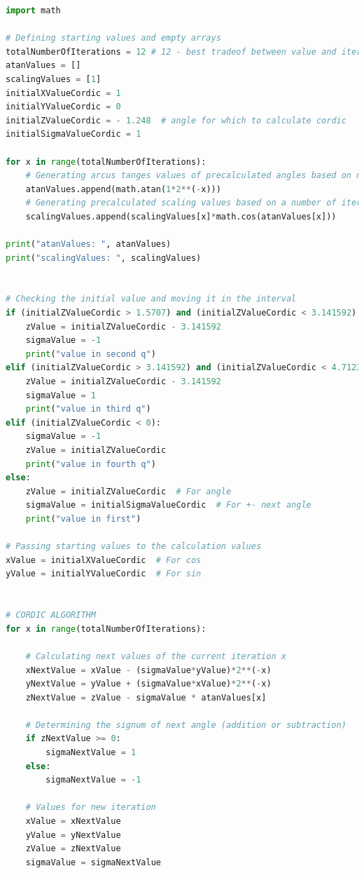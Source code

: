 \documentclass[a4paper, twoside, 11pt]{article}
\begin{document}
\begin{lstlisting}[language={python}, caption={Python code of \gls{abbreviation:cordic} implementation.}, label= {lst:python-cordic}]
import math

# Defining starting values and empty arrays
totalNumberOfIterations = 12 # 12 - best tradeof between value and iterations
atanValues = []
scalingValues = [1]
initialXValueCordic = 1
initialYValueCordic = 0
initialZValueCordic = - 1.248  # angle for which to calculate cordic
initialSigmaValueCordic = 1

for x in range(totalNumberOfIterations):
    # Generating arcus tanges values of precalculated angles based on number of iterations
    atanValues.append(math.atan(1*2**(-x)))
    # Generating precalculated scaling values based on a number of iterations
    scalingValues.append(scalingValues[x]*math.cos(atanValues[x]))

print("atanValues: ", atanValues)
print("scalingValues: ", scalingValues)


# Checking the initial value and moving it in the interval
if (initialZValueCordic > 1.5707) and (initialZValueCordic < 3.141592):
    zValue = initialZValueCordic - 3.141592
    sigmaValue = -1
    print("value in second q")
elif (initialZValueCordic > 3.141592) and (initialZValueCordic < 4.7123):
    zValue = initialZValueCordic - 3.141592
    sigmaValue = 1
    print("value in third q")
elif (initialZValueCordic < 0):
    sigmaValue = -1
    zValue = initialZValueCordic
    print("value in fourth q")
else:
    zValue = initialZValueCordic  # For angle
    sigmaValue = initialSigmaValueCordic  # For +- next angle
    print("value in first")

# Passing starting values to the calculation values
xValue = initialXValueCordic  # For cos
yValue = initialYValueCordic  # For sin


# CORDIC ALGORITHM
for x in range(totalNumberOfIterations):

    # Calculating next values of the current iteration x
    xNextValue = xValue - (sigmaValue*yValue)*2**(-x)
    yNextValue = yValue + (sigmaValue*xValue)*2**(-x)
    zNextValue = zValue - sigmaValue * atanValues[x]

    # Determining the signum of next angle (addition or subtraction)
    if zNextValue >= 0:
        sigmaNextValue = 1
    else:
        sigmaNextValue = -1

    # Values for new iteration
    xValue = xNextValue
    yValue = yNextValue
    zValue = zNextValue
    sigmaValue = sigmaNextValue


\end{lstlisting}
\end{document}
